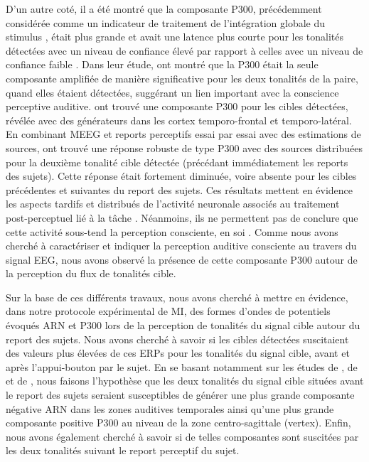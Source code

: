 D'un autre coté, il a été montré que la composante P300, précédemment considérée comme un indicateur de traitement de l'intégration globale du stimulus \citep{dehaene2006conscious, del2007brain, sergent2004neural, sergent2005timing}, était plus grande et avait une latence plus courte pour les tonalités détectées avec un niveau de confiance élevé par rapport à celles avec un niveau de confiance faible \citep{parasuraman1980brain, paul1972evoked, squires1973vertex}. 
Dans leur étude, \cite{giani2015detecting} ont montré que la P300 était la seule composante amplifiée de manière significative pour les deux tonalités de la paire, quand elles étaient détectées, suggérant un lien important avec la conscience perceptive auditive. 
\cite{dykstra2016neural} ont trouvé une composante P300 pour les cibles détectées, révélée avec des générateurs dans les cortex temporo-frontal et temporo-latéral. 
En combinant MEEG et reports perceptifs essai par essai avec des estimations de sources, \cite{dykstra2017electrophysiological} ont trouvé une réponse robuste de type P300 avec des sources distribuées pour la deuxième tonalité cible détectée (précédant immédiatement les reports des sujets). 
Cette réponse était fortement diminuée, voire absente pour les cibles précédentes et suivantes du report des sujets. 
Ces résultats mettent en évidence les aspects tardifs et distribués de l'activité neuronale associés au traitement post-perceptuel lié à la tâche \citep{pitts2014gamma}. 
Néanmoins, ils ne permettent pas de conclure que cette activité sous-tend la perception consciente, en soi \citep{tsuchiya2015no}. 
Comme nous avons cherché à caractériser et indiquer la perception auditive consciente au travers du signal EEG, nous avons observé la présence de cette composante P300 autour de la perception du flux de tonalités cible. 

Sur la base de ces différents travaux, nous avons cherché à mettre en évidence, dans notre protocole expérimental de MI, des formes d’ondes de potentiels évoqués ARN et P300 lors de la perception de tonalités du signal cible autour du report des sujets.  
Nous avons cherché à savoir si les cibles détectées suscitaient des valeurs plus élevées de ces ERPs pour les tonalités du signal cible, avant et après l'appui-bouton par le sujet. 
En se basant notamment sur les études de \cite{gutschalk2008neural}, de \cite{wiegand2012correlates} et de \cite{giani2015detecting}, nous faisons l'hypothèse que les deux tonalités du signal cible situées avant le report des sujets seraient susceptibles de générer une plus grande composante négative ARN dans les zones auditives temporales ainsi qu'une plus grande composante positive P300 au niveau de la zone centro-sagittale (vertex). 
Enfin, nous avons également cherché à savoir si de telles composantes sont suscitées par les deux tonalités suivant le report perceptif du sujet. 

